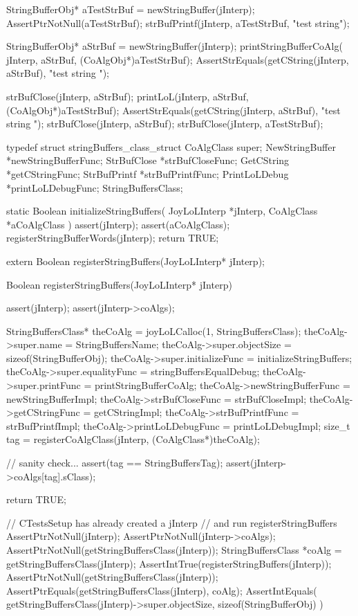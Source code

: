   StringBufferObj* aTestStrBuf = newStringBuffer(jInterp);
  AssertPtrNotNull(aTestStrBuf);
  strBufPrintf(jInterp, aTestStrBuf, "test string");
  
  StringBufferObj* aStrBuf = newStringBuffer(jInterp);
  printStringBufferCoAlg(
    jInterp, aStrBuf, (CoAlgObj*)aTestStrBuf);
  AssertStrEquals(getCString(jInterp, aStrBuf), "test string ");
  
  strBufClose(jInterp, aStrBuf);
  printLoL(jInterp, aStrBuf, (CoAlgObj*)aTestStrBuf);
  AssertStrEquals(getCString(jInterp, aStrBuf), "test string ");
  strBufClose(jInterp, aStrBuf);
  strBufClose(jInterp, aTestStrBuf);
\stopCTest
\stopTestCase
\stopTestSuite

\startTestSuite[registerStringBuffers]

\startCHeader
typedef struct stringBuffers_class_struct {
  CoAlgClass       super;
  NewStringBuffer *newStringBufferFunc;
  StrBufClose     *strBufCloseFunc;
  GetCString      *getCStringFunc;
  StrBufPrintf    *strBufPrintfFunc;
  PrintLoLDebug   *printLoLDebugFunc;
} StringBuffersClass;
\stopCHeader

\startCCode
static Boolean initializeStringBuffers(
  JoyLoLInterp *jInterp,
  CoAlgClass   *aCoAlgClass
) {
  assert(jInterp);
  assert(aCoAlgClass);
  registerStringBufferWords(jInterp);
  return TRUE;
}
\stopCCode

\startCHeader
extern Boolean registerStringBuffers(JoyLoLInterp* jInterp);
\stopCHeader
{}

\startCCode
Boolean registerStringBuffers(JoyLoLInterp* jInterp) {
  assert(jInterp);
  assert(jInterp->coAlgs);
  
  StringBuffersClass* theCoAlg  =
    joyLoLCalloc(1, StringBuffersClass);
  theCoAlg->super.name            = StringBuffersName;
  theCoAlg->super.objectSize      = sizeof(StringBufferObj);
  theCoAlg->super.initializeFunc  = initializeStringBuffers;
  theCoAlg->super.equalityFunc    = stringBuffersEqualDebug;
  theCoAlg->super.printFunc       = printStringBufferCoAlg;
  theCoAlg->newStringBufferFunc   = newStringBufferImpl;
  theCoAlg->strBufCloseFunc       = strBufCloseImpl;
  theCoAlg->getCStringFunc        = getCStringImpl;
  theCoAlg->strBufPrintfFunc      = strBufPrintfImpl;
  theCoAlg->printLoLDebugFunc     = printLoLDebugImpl;
  size_t tag =
    registerCoAlgClass(jInterp, (CoAlgClass*)theCoAlg);
  
  // sanity check...
  assert(tag == StringBuffersTag);
  assert(jInterp->coAlgs[tag].sClass);

  return TRUE;
}
\stopCCode


\startCTest
  // CTestsSetup has already created a jInterp
  // and run registerStringBuffers
  AssertPtrNotNull(jInterp);
  AssertPtrNotNull(jInterp->coAlgs);
  AssertPtrNotNull(getStringBuffersClass(jInterp));
  StringBuffersClass *coAlg =
    getStringBuffersClass(jInterp);
  AssertIntTrue(registerStringBuffers(jInterp));
  AssertPtrNotNull(getStringBuffersClass(jInterp));
  AssertPtrEquals(getStringBuffersClass(jInterp), coAlg);
  AssertIntEquals(
    getStringBuffersClass(jInterp)->super.objectSize,
    sizeof(StringBufferObj)
  )
\stopCTest
\stopTestCase
\stopTestSuite
